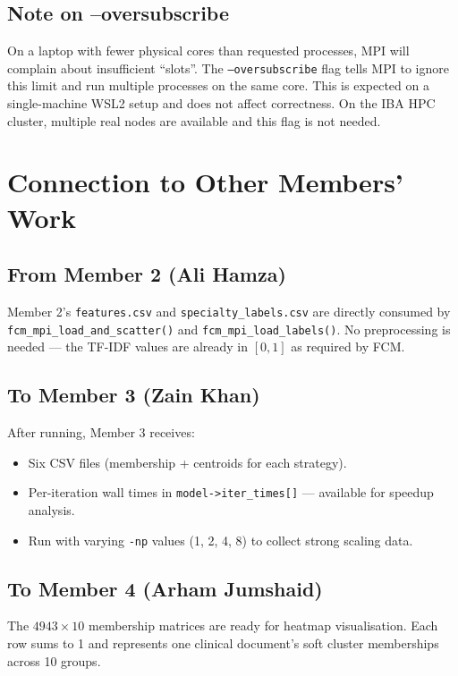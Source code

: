 \documentclass[12pt,a4paper]{article}
\begin{document}
\subsection{Note on --oversubscribe}

On a laptop with fewer physical cores than requested processes, MPI will complain about insufficient ``slots''. The \texttt{--oversubscribe} flag tells MPI to ignore this limit and run multiple processes on the same core. This is expected on a single-machine WSL2 setup and does not affect correctness. On the IBA HPC cluster, multiple real nodes are available and this flag is not needed.

\section{Connection to Other Members' Work}

\subsection{From Member 2 (Ali Hamza)}
Member 2's \texttt{features.csv} and \texttt{specialty\_labels.csv} are directly consumed by \texttt{fcm\_mpi\_load\_and\_scatter()} and \texttt{fcm\_mpi\_load\_labels()}. No preprocessing is needed --- the TF-IDF values are already in $[0,1]$ as required by FCM.

\subsection{To Member 3 (Zain Khan)}
After running, Member 3 receives:
\begin{itemize}[leftmargin=1.5em]
    \item Six CSV files (membership + centroids for each strategy).
    \item Per-iteration wall times in \texttt{model->iter\_times[]} — available for speedup analysis.
    \item Run with varying \texttt{-np} values (1, 2, 4, 8) to collect strong scaling data.
\end{itemize}

\subsection{To Member 4 (Arham Jumshaid)}
The $4943 \times 10$ membership matrices are ready for heatmap visualisation. Each row sums to 1 and represents one clinical document's soft cluster memberships across 10 groups.
\end{document}
